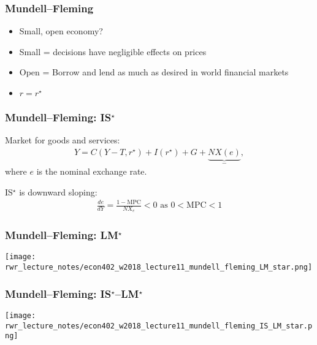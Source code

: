 \documentclass[presentation,dvipsnames]{beamer}
\begin{document}
\begin{frame}
\frametitle{Mundell--Fleming}
\begin{itemize}[label={--}]
\item Small, open economy?
\item Small = decisions have negligible effects on prices
\item Open = Borrow and lend as much as desired in world financial markets
\item $r = r^{\star}$
\end{itemize}
\end{frame}

\begin{frame}
\frametitle{Mundell--Fleming: IS$^{\star}$}
Market for goods and services:
\begin{align*}
Y = C(Y-T, r^{\star})  + I(r^{\star}) + G + \underbrace{NX(e)}_{-} ,
\end{align*}
where $e$ is the nominal exchange rate.

\vspace{1em}

IS$^{\star}$ is downward sloping:
\begin{align*}
\frac{de}{dY} = \frac{1-\text{MPC}}{NX_{e}} < 0 \text{ as } 0 < \text{MPC} < 1
\end{align*}
\end{frame}


\begin{frame}
\frametitle{Mundell--Fleming: LM$^{\star}$}
\centering
\texttt{[image: rwr\_lecture\_notes/econ402\_w2018\_lecture11\_mundell\_fleming\_LM\_star.png]}
\end{frame}

\begin{frame}
\frametitle{Mundell--Fleming: IS$^{\star}$--LM$^{\star}$}
\centering
\texttt{[image: rwr\_lecture\_notes/econ402\_w2018\_lecture11\_mundell\_fleming\_IS\_LM\_star.png]}
\end{frame}
\end{document}
